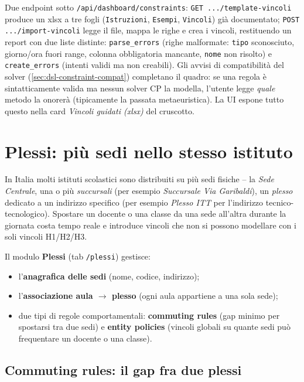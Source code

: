 Due endpoint sotto \texttt{/api/dashboard/constraints}:
\texttt{GET .../template-vincoli} produce un xlsx a tre fogli
(\texttt{Istruzioni}, \texttt{Esempi}, \texttt{Vincoli}) gi\`a documentato;
\texttt{POST .../import-vincoli} legge il file, mappa le righe e crea i
vincoli, restituendo un report con due liste distinte: \texttt{parse\_errors}
(righe malformate: \texttt{tipo} sconosciuto, giorno/ora fuori range, colonna
obbligatoria mancante, \texttt{nome} non risolto) e \texttt{create\_errors}
(intenti validi ma non creabili). Gli avvisi di compatibilit\`a del solver
(\cref{sec:dsl-constraint-compat}) completano il quadro: se una regola \`e
sintatticamente valida ma nessun solver CP la modella, l'utente legge
\emph{quale} metodo la onorer\`a (tipicamente la passata metaeuristica). La
UI espone tutto questo nella card \emph{Vincoli guidati (xlsx)} del
cruscotto.

\section{Plessi: pi\`u sedi nello stesso istituto}
\label{sec:plessi}

In Italia molti istituti scolastici sono distribuiti su pi\`u
sedi fisiche -- la \emph{Sede Centrale}, una o pi\`u
\emph{succursali} (per esempio \emph{Succursale Via
Garibaldi}), un \emph{plesso} dedicato a un indirizzo
specifico (per esempio \emph{Plesso ITT} per l'indirizzo
tecnico-tecnologico). Spostare un docente o una classe da
una sede all'altra durante la giornata costa tempo reale e
introduce vincoli che non si possono modellare con i soli
vincoli H1/H2/H3.

Il modulo \textbf{Plessi} (tab \texttt{/plessi}) gestisce:
\begin{itemize}
\item l'\textbf{anagrafica delle sedi} (nome, codice,
indirizzo);
\item l'\textbf{associazione aula $\to$ plesso} (ogni aula
appartiene a una sola sede);
\item due tipi di regole comportamentali:
\textbf{commuting rules} (gap minimo per spostarsi tra due
sedi) e \textbf{entity policies} (vincoli globali su quante
sedi pu\`o frequentare un docente o una classe).
\end{itemize}

\subsection{Commuting rules: il gap fra due plessi}

